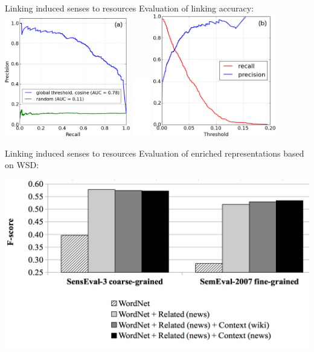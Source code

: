 \begin{frame}{ Linking induced senses to resources }
		\vspace{2em}
		Evaluation of linking accuracy:
		\centering
\includegraphics[width=0.41\textwidth]{figures/precision-recall}
\includegraphics[width=0.06\textwidth]{figures/filler}
\includegraphics[width=0.40\textwidth]{figures/pr-function-of-threshold}

\end{frame}

\begin{frame}{ Linking induced senses to resources }
\centering
Evaluation of enriched representations based on WSD:

\includegraphics[width=1.0\textwidth]{figures/topic-hist-4}

\end{frame}


